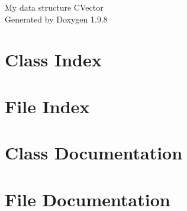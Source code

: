 \documentclass[twoside]{book}
\newcommand{\+}{\discretionary{\mbox{\scriptsize$\hookleftarrow$}}{}{}}
\newcommand{\clearemptydoublepage}{%
    \newpage{\pagestyle{empty}\cleardoublepage}%
  }
\begin{document}
  \raggedbottom
    \hypersetup{pageanchor=false,
                bookmarksnumbered=true,
                pdfencoding=unicode
               }
  \begin{titlepage}
  \vspace*{7cm}
  \begin{center}%
  {\Large My data structure CVector}\\
  \vspace*{1cm}
  {\large Generated by Doxygen 1.9.8}\\
  \end{center}
  \end{titlepage}
  \clearemptydoublepage
  \tableofcontents
  \clearemptydoublepage
  \hypersetup{pageanchor=true}

\chapter{Class Index}

\chapter{File Index}

\chapter{Class Documentation}

\chapter{File Documentation}



  \backmatter
  \newpage
  \clearemptydoublepage
  \printindex
\end{document}
